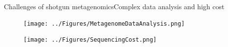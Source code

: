 \documentclass{beamer}
\begin{document}
\begin{frame}{Challenges of shotgun metagenomics}{Complex data analysis and high cost}
    \begin{figure}
        \texttt{[image: ../Figures/MetagenomeDataAnalysis.png]}
    \end{figure}
    \begin{figure}
        \texttt{[image: ../Figures/SequencingCost.png]}
    \end{figure}
\end{frame}
\end{document}
